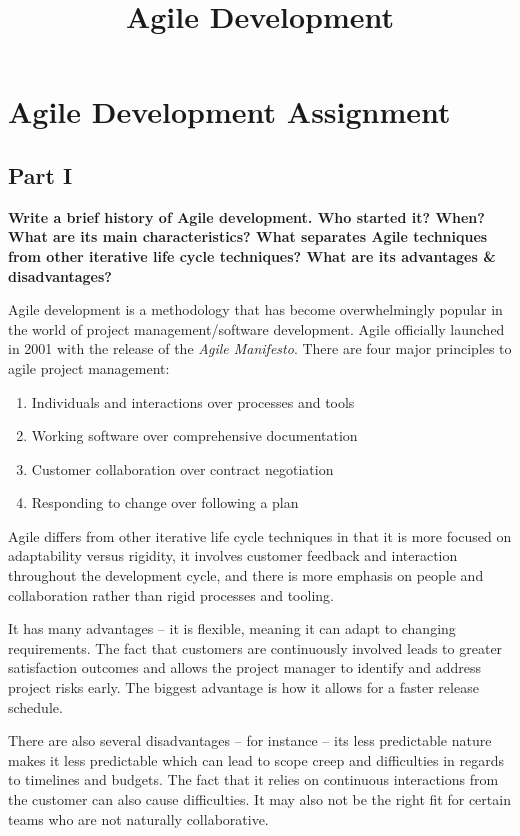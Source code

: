 \documentclass{article}
\title{Agile Development}
\begin{document}
\thispagestyle{fancy}

\section{Agile Development Assignment}

\subsection*{Part I}

\textbf{Write a brief history of Agile development. Who started it? When? What are its main characteristics? What separates Agile techniques from other iterative life cycle techniques? What are its advantages \& disadvantages?}

Agile development is a methodology that has become overwhelmingly popular in the world of project management/software development. Agile officially launched in 2001 with the release of the \textit{Agile Manifesto}. There are four major principles to agile project management:
\begin{enumerate}
    \item Individuals and interactions over processes and tools
    \item Working software over comprehensive documentation
    \item Customer collaboration over contract negotiation
    \item Responding to change over following a plan
\end{enumerate}

Agile differs from other iterative life cycle techniques in that it is more focused on adaptability versus rigidity, it involves customer feedback and interaction throughout the development cycle, and there is more emphasis on people and collaboration rather than rigid processes and tooling.

It has many advantages -- it is flexible, meaning it can adapt to changing requirements. The fact that customers are continuously involved leads to greater satisfaction outcomes and allows the project manager to identify and address project risks early. The biggest advantage is how it allows for a faster release schedule.

There are also several disadvantages -- for instance -- its less predictable nature makes it less predictable which can lead to scope creep and difficulties in regards to timelines and budgets. The fact that it relies on continuous interactions from the customer can also cause difficulties. It may also not be the right fit for certain teams who are not naturally collaborative.
\end{document}
